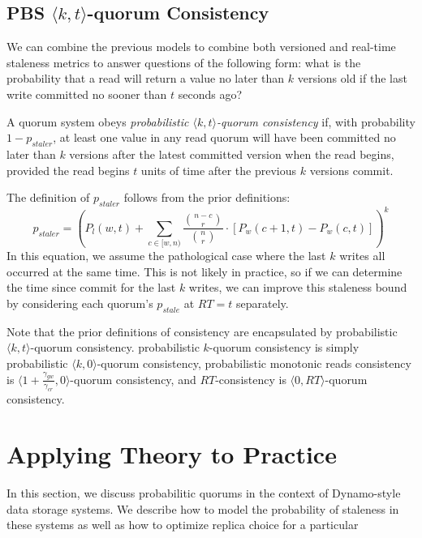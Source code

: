 \documentclass{vldb}
\begin{document}
\subsection{PBS $\langle k, t
  \rangle$-quorum Consistency}

We can combine the previous models to combine both versioned and
real-time staleness metrics to answer questions of the following form:
what is the probability that a read will return a value no later than
$k$ versions old if the last write committed no sooner than $t$ seconds
ago?
\begin{definition}
A quorum system obeys \textit{probabilistic $\langle k, t
  \rangle$-quorum consistency} if, with probability $1-p_{staler}$, at
least one value in any read quorum will have been committed no later
than $k$ versions after the latest committed version when the read
begins, provided the read begins $t$ units of time after the previous
$k$ versions commit.
\end{definition}
The definition of $p_{staler}$ follows from the prior definitions:
\begin{equation}
p_{staler} = (P_l(w, t)+\sum_{c\in[w, n)} \frac{{n-c \choose r}}{{n \choose r}} \cdot [P_w(c+1, t)-P_w(c,t)])^k
\end{equation}
In this equation, we assume the pathological case where the last $k$
writes all occurred at the same time.  This is not likely in practice,
so if we can determine the time since commit for the last $k$ writes,
we can improve this staleness bound by considering each quorum's $p_{stale}$ at $RT=t$ separately.

Note that the prior definitions of consistency are encapsulated by
probabilistic $\langle k, t \rangle$-quorum consistency. probabilistic
$k$-quorum consistency is simply probabilistic $\langle k, 0
\rangle$-quorum consistency, probabilistic monotonic reads consistency
is $\langle 1+\frac{\gamma_{gw}}{\gamma_{cr}}, 0 \rangle$-quorum
consistency, and $RT$-consistency is $\langle 0, RT \rangle$-quorum
consistency.

\section{Applying Theory to Practice}
\label{sec:optimize}

In this section, we discuss probabilitic quorums in the context of
Dynamo-style data storage systems.  We describe how to model the
probability of staleness in these systems as well as how to optimize
replica choice for a particular
\end{document}
